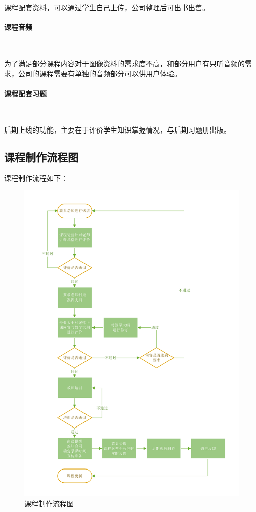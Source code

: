 课程配套资料，可以通过学生自己上传，公司整理后可出书出售。

\paragraph{课程音频}\

为了满足部分课程内容对于图像资料的需求度不高，和部分用户有只听音频的需求，公司的课程需要有单独的音频部分可以供用户体验。

\paragraph{课程配套习题}\

后期上线的功能，主要在于评价学生知识掌握情况，与后期习题册出版。

\subsection{课程制作流程图}
课程制作流程如下：
\begin{figure}[H]
	\centering
	\includegraphics[width=0.9\columnwidth]{figures/couse_process}
	\caption{课程制作流程图}
	\label{fg:couse_process}
\end{figure}

